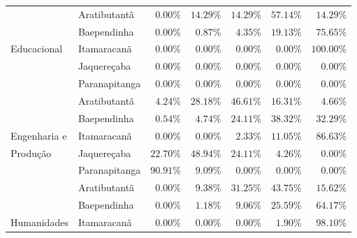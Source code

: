 \begin{table}[h]
\begin{tabular}{ll rrrrr}
				& Aratibutantã            &               $0.00\%$ &        $14.29\%$ &       $14.29\%$ &      $57.14\%$ &            $14.29\%$ \\ 
                & Baependinha             &               $0.00\%$ &         $0.87\%$ &        $4.35\%$ &      $19.13\%$ &            $75.65\%$ \\ 
Educacional     & Itamaracanã             &               $0.00\%$ &         $0.00\%$ &        $0.00\%$ &       $0.00\%$ &           $100.00\%$ \\ 
                & Jaquereçaba             &               $0.00\%$ &         $0.00\%$ &        $0.00\%$ &       $0.00\%$ &             $0.00\%$ \\ 
                & Paranapitanga           &               $0.00\%$ &         $0.00\%$ &        $0.00\%$ &       $0.00\%$ &             $0.00\%$ \\ 
\midrule{}                                                                                                                          
				& Aratibutantã            &               $4.24\%$ &        $28.18\%$ &       $46.61\%$ &      $16.31\%$ &             $4.66\%$ \\ 
                & Baependinha             &               $0.54\%$ &         $4.74\%$ &       $24.11\%$ &      $38.32\%$ &            $32.29\%$ \\ 
Engenharia e    & Itamaracanã             &               $0.00\%$ &         $0.00\%$ &        $2.33\%$ &      $11.05\%$ &            $86.63\%$ \\ 
Produção        & Jaquereçaba             &              $22.70\%$ &        $48.94\%$ &       $24.11\%$ &       $4.26\%$ &             $0.00\%$ \\ 
                & Paranapitanga           &              $90.91\%$ &         $9.09\%$ &        $0.00\%$ &       $0.00\%$ &             $0.00\%$ \\ 
\midrule{}                                                                                                                          
				& Aratibutantã            &               $0.00\%$ &         $9.38\%$ &       $31.25\%$ &      $43.75\%$ &            $15.62\%$ \\ 
                & Baependinha             &               $0.00\%$ &         $1.18\%$  &       $ 9.06\%$ &      $25.59\%$ &            $64.17\%$ \\ 
Humanidades     & Itamaracanã             &               $0.00\%$ &         $0.00\%$ &        $0.00\%$ &       $1.90\%$ &            $98.10\%$ \\ 

\end{tabular}
\end{table}
